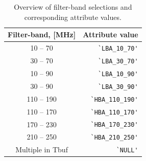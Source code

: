 \begin{table}[ht]
  \centering
  \begin{tabular}{|cr|}
    \hline
    \sc Filter-band, [MHz] & \sc Attribute value \\
    \hline \hline
    10 -- 70   & \verb|`LBA_10_70'| \\
    30 -- 70   & \verb|`LBA_30_70'| \\
    10 -- 90   & \verb|`LBA_10_90'| \\
    30 -- 90   & \verb|`LBA_30_90'| \\
    110 -- 190 & \verb|`HBA_110_190'| \\
    110 -- 170 & \verb|`HBA_110_170'| \\
    170 -- 230 & \verb|`HBA_170_230'| \\
    210 -- 250 & \verb|`HBA_210_250'| \\
    Multiple in Tbuf   & \verb|`NULL'| \\
    \hline
  \end{tabular}
  \caption{Overview of filter-band selections and corresponding
    attribute values.}
  \label{tab:filter-selection}
\end{table}
